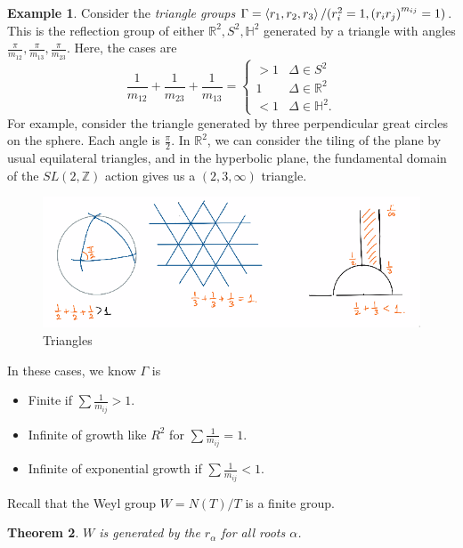 \documentclass[leqno, openany]{memoir}
\newtheorem{thm}{Theorem}[section]
\theoremstyle{definition}
\newtheorem{exm}[thm]{Example}
\theoremstyle{remark}
\theoremstyle{plain}
\theoremstyle{definition}
\theoremstyle{remark}
\newcommand{\R}{\mathbb{R}}
\newcommand{\Z}{\mathbb{Z}}
\begin{document}
\begin{exm}
    Consider the \textit{triangle groups} $\Gamma = \ev{r_1, r_2, r_3} / (r_i^2 = 1, {(r_i r_j)}^{m_{ij}} = 1)$. This is the reflection group of either $\R^2, S^2, \mathbb{H}^2$ generated by a triangle with angles $\frac{\pi}{m_{12}}, \frac{\pi}{m_{13}}, \frac{\pi}{m_{23}}$. Here, the cases are
    \[ \frac{1}{m_{12}} + \frac{1}{m_{23}} + \frac{1}{m_{13}} = \begin{cases}
        > 1 & \Delta \in S^2 \\
        1 & \Delta \in \R^2 \\
        < 1 & \Delta \in \mathbb{H}^2.
    \end{cases} \]
    For example, consider the triangle generated by three perpendicular great circles on the sphere. Each angle is $\frac{\pi}{2}$. In $\R^2$, we can consider the tiling of the plane by usual equilateral triangles, and in the hyperbolic plane, the fundamental domain of the $SL(2, \Z)$ action gives us a $(2,3,\infty)$ triangle.
    \begin{figure}[H]
        \centering
        \includegraphics[width=0.8\linewidth]{triangles.png}
        \caption{Triangles}%
        \label{fig:triangles}
    \end{figure}
    In these cases, we know $\Gamma$ is 
    \begin{itemize}
        \item Finite if $\sum \frac{1}{m_{ij}} > 1$.
        \item Infinite of growth like $R^2$ for $\sum \frac{1}{m_{ij}} = 1$.
        \item Infinite of exponential growth if $\sum \frac{1}{m_{ij}} < 1$.
    \end{itemize}
\end{exm}

Recall that the Weyl group $W = N(T) / T$ is a finite group. 

\begin{thm}
    $W$ is generated by the $r_{\alpha}$ for all roots $\alpha$.
\end{thm}
\end{document}
